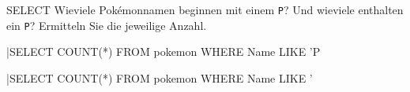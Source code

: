 \begin{example}{SELECT}
    Wieviele Pokémonnamen beginnen mit einem \texttt{P}?
    Und wieviele enthalten ein \texttt{P}?
    Ermitteln Sie die jeweilige Anzahl.

    \exampleseparator

    |SELECT COUNT(*) FROM pokemon WHERE Name LIKE 'P%

    

    |SELECT COUNT(*) FROM pokemon WHERE Name LIKE '%

    
\end{example}